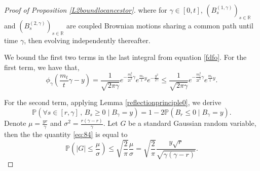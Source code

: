 \documentclass[10pt,a4paper]{amsart}
\newcommand{\Prob}{\mathbb{P}}
\begin{document}
\begin{proof}[Proof of Proposition \ref{L2boundlocancestor}]
where for $\gamma \in \left[0,t\right]$, $(B^{(1,\gamma)}_s)_{s\in \mathbb{R}}$ and $(B^{(2,\gamma)}_s)_{s\in \mathbb{R}}$ are coupled Brownian motions sharing a common path until time $\gamma$, then evolving independently thereafter.


We bound the first two terms in the last integral from equation \eqref{fdfo}. For the first term, we have that,
\begin{equation}
    \phi_\gamma\left(\frac{m_t}{t}\gamma-y\right)= \frac{1}{\sqrt{2 \pi \gamma}}e^{-\frac{m_t^2}{2t^2}\gamma}e^{\frac{m_t}{t}y}e^{- \frac{y^2}{2\gamma}} \leq \frac{1}{\sqrt{2 \pi \gamma}}e^{-\frac{m_t^2}{2t^2}\gamma}e^{\frac{m_t}{t}y}.
\end{equation}

For the second term, applying Lemma \ref{reflectionprinciple0}, we derive
\begin{equation} \label{eq:84}
    \Prob\left(\forall s \in [r, \gamma] \, , \, B_s \geq 0 \mid B_\gamma = y \right)= 1- 2\Prob(B_r \leq 0 \mid B_\gamma = y ).
\end{equation}
Denote $\mu = \frac{y r}{\gamma}$ and $\sigma^2= \frac{r(\gamma - r)}{\gamma}$. Let $G$ be a standard Gaussian random variable, then the the quantity \eqref{eq:84} is equal to
\begin{equation}
    \Prob\left( |G| \leq \frac{\mu}{\sigma}\right) \leq \sqrt{\frac{2}{ \pi}} \frac{\mu}{\sigma}=\sqrt{\frac{2}{ \pi}} \frac{y \sqrt{r}}{\sqrt{\gamma(\gamma - r)}}.
\end{equation}


\end{proof}
\end{document}
